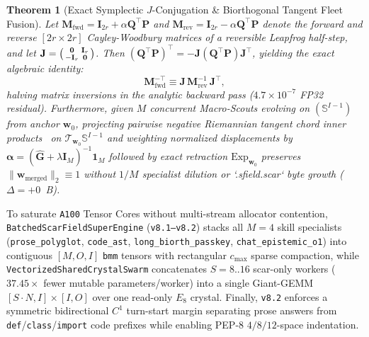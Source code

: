 \documentclass[10pt,twocolumn]{article}
\newtheorem{theorem}{Theorem}
\begin{document}
\begin{theorem}[Exact Symplectic $J$-Conjugation \& Biorthogonal Tangent Fleet Fusion]
\label{thm:v8_symplectic_fleet}
Let $\mathbf{M}_{\text{fwd}} = \mathbf{I}_{2r} + \alpha \mathbf{Q}^\top\mathbf{P}$ and $\mathbf{M}_{\text{rev}} = \mathbf{I}_{2r} - \alpha \mathbf{Q}^\top\mathbf{P}$ denote the forward and reverse $[2r \times 2r]$ Cayley-Woodbury matrices of a reversible Leapfrog half-step, and let $\mathbf{J} = \begin{psmallmatrix} \mathbf{0} & \mathbf{I}_r \\ -\mathbf{I}_r & \mathbf{0} \end{psmallmatrix}$. Then $(\mathbf{Q}^\top\mathbf{P})^\top = -\mathbf{J}(\mathbf{Q}^\top\mathbf{P})\mathbf{J}^\top$, yielding the exact algebraic identity:
\begin{equation}
    \mathbf{M}_{\text{fwd}}^{-\top} \equiv \mathbf{J}\,\mathbf{M}_{\text{rev}}^{-1}\,\mathbf{J}^\top,
    \label{eq:j_conj}
\end{equation}
halving matrix inversions in the analytic backward pass ($4.7\times 10^{-7}$ FP32 residual). Furthermore, given $M$ concurrent Macro-Scouts evolving on $(\mathbb{S}^{I-1})$ from anchor $\mathbf{w}_0$, projecting pairwise negative Riemannian tangent chord inner products~\citep{yu2020gradient} on $\mathcal{T}_{\mathbf{w}_0}\mathbb{S}^{I-1}$ and weighting normalized displacements by $\boldsymbol{\alpha} = (\widehat{\mathbf{G}} + \lambda\mathbf{I}_M)^{-1}\mathbf{1}_M$ followed by exact retraction $\mathrm{Exp}_{\mathbf{w}_0}$ preserves $\|\mathbf{w}_{\text{merged}}\|_2 \equiv 1$ without $1/M$ specialist dilution or `.sfield.scar` byte growth ($\Delta = +0$~B).
\end{theorem}

To saturate \texttt{A100} Tensor Cores without multi-stream allocator contention, \texttt{BatchedScarFieldSuperEngine} (\texttt{v8.1--v8.2}) stacks all $M=4$ skill specialists (\texttt{prose\_polyglot}, \texttt{code\_ast}, \texttt{long\_biorth\_passkey}, \texttt{chat\_epistemic\_o1}) into contiguous $[M, O, I]$ \texttt{bmm} tensors with rectangular $c_{\max}$ sparse compaction, while \texttt{VectorizedSharedCrystalSwarm} concatenates $S=8..16$ scar-only workers ($37.45\times$ fewer mutable parameters/worker) into a single Giant-GEMM $[S\cdot N, I] \times [I, O]$ over one read-only $E_8$ crystal. Finally, \texttt{v8.2} enforces a symmetric bidirectional $C^1$ turn-start margin separating prose answers from \texttt{def}/\texttt{class}/\texttt{import} code prefixes while enabling PEP-8 $4/8/12$-space indentation.
\end{document}
